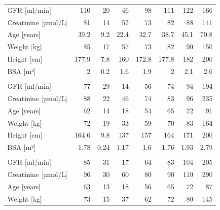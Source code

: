 \documentclass[11pt,]{article}
\begin{document}
\begin{longtable}[t]{lrrrrrrr}
\addlinespace[0.6em]
\multicolumn{8}{l}{\textbf{London-Barts}}\\
\hline
\hspace{1em}GFR [ml/min] & 110 & 20 & 46 & 98 & 111 & 122 & 166\\
\hspace{1em}Creatinine [µmol/L] & 81 & 14 & 52 & 73 & 82 & 88 & 141\\
\hspace{1em}Age [years] & 39.2 & 9.2 & 22.4 & 32.7 & 38.7 & 45.1 & 70.8\\
\hspace{1em}Weight [kg] & 85 & 17 & 57 & 73 & 82 & 90 & 150\\
\hspace{1em}Height [cm] & 177.9 & 7.8 & 160 & 172.8 & 177.8 & 182 & 200\\
\hspace{1em}BSA [m²] & 2 & 0.2 & 1.6 & 1.9 & 2 & 2.1 & 2.6\\
\addlinespace[0.6em]
\multicolumn{8}{l}{\textbf{Manchester}}\\
\hline
\hspace{1em}GFR [ml/min] & 77 & 29 & 14 & 56 & 74 & 94 & 194\\
\hspace{1em}Creatinine [µmol/L] & 88 & 22 & 46 & 74 & 83 & 96 & 235\\
\hspace{1em}Age [years] & 62 & 14 & 18 & 54 & 65 & 72 & 91\\
\hspace{1em}Weight [kg] & 72 & 19 & 33 & 59 & 70 & 83 & 164\\
\hspace{1em}Height [cm] & 164.6 & 9.8 & 137 & 157 & 164 & 171 & 200\\
\hspace{1em}BSA [m²] & 1.78 & 0.24 & 1.17 & 1.6 & 1.76 & 1.93 & 2.79\\
\addlinespace[0.6em]
\multicolumn{8}{l}{\textbf{Melbourne}}\\
\hline
\hspace{1em}GFR [ml/min] & 85 & 31 & 17 & 64 & 83 & 104 & 205\\
\hspace{1em}Creatinine [µmol/L] & 96 & 30 & 60 & 80 & 90 & 110 & 290\\
\hspace{1em}Age [years] & 63 & 13 & 18 & 56 & 65 & 72 & 87\\
\hspace{1em}Weight [kg] & 73 & 15 & 37 & 62 & 72 & 80 & 145\\

\end{longtable}
\end{document}
